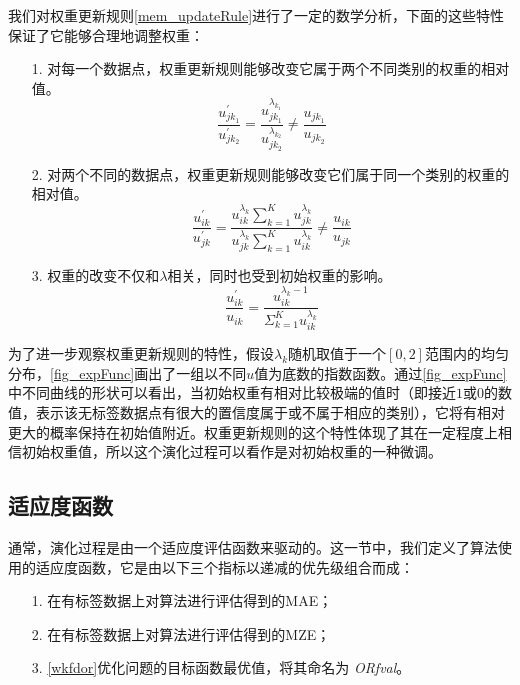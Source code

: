 我们对权重更新规则\autoref{mem_updateRule}进行了一定的数学分析，下面的这些特性保证了它能够合理地调整权重：
\begin{enumerate}
\item[1.]对每一个数据点，权重更新规则能够改变它属于两个不同类别的权重的相对值。
\\ \[ \frac{u_{jk_{1}}^{'}}{u_{jk_{2}}^{'}}=\frac{u_{jk_{1}}^{\lambda_{k_{1}}}}{u_{jk_{2}}^{\lambda_{k_{2}}}} \neq \frac{u_{jk_{1}}}{u_{jk_{2}}} \]
%
\item[2.]对两个不同的数据点，权重更新规则能够改变它们属于同一个类别的权重的相对值。
\\ \[ \frac{u_{ik}^{'}}{u_{jk}^{'}}=\frac{u_{ik}^{\lambda_{k}} \sum_{k=1}^{K}u_{jk}^{\lambda_{k}}}{u_{jk}^{\lambda_{k}} \sum_{k=1}^{K}u_{ik}^{\lambda_{k}}} \neq \frac{u_{ik}}{u_{jk}} \]
%
\item[3.]权重的改变不仅和\(\lambda\)相关，同时也受到初始权重的影响。
\\ \[ \frac{u_{ik}^{'}}{u_{ik}}=\frac{u_{ik}^{\lambda_{k}-1}}{\Sigma_{k=1}^{K} u_{ik}^{\lambda_{k}}} \]
\end{enumerate}

为了进一步观察权重更新规则的特性，假设\(\lambda_{k}\)随机取值于一个\([0,2]\)范围内的均匀分布，\autoref{fig_expFunc}画出了一组以不同\(u\)值为底数的指数函数。通过\autoref{fig_expFunc}中不同曲线的形状可以看出，当初始权重有相对比较极端的值时（即接近\(1\)或\(0\)的数值，表示该无标签数据点有很大的置信度属于或不属于相应的类别），它将有相对更大的概率保持在初始值附近。权重更新规则的这个特性体现了其在一定程度上相信初始权重值，所以这个演化过程可以看作是对初始权重的一种微调。


\subsection{适应度函数}
通常，演化过程是由一个适应度评估函数来驱动的。这一节中，我们定义了算法使用的适应度函数，它是由以下三个指标以递减的优先级组合而成：
\begin{enumerate}
\item[1.]在有标签数据上对算法进行评估得到的MAE；
\item[2.]在有标签数据上对算法进行评估得到的MZE；
\item[3.]\autoref{wkfdor}优化问题的目标函数最优值，将其命名为 \textit{ORfval}。
\end{enumerate}

